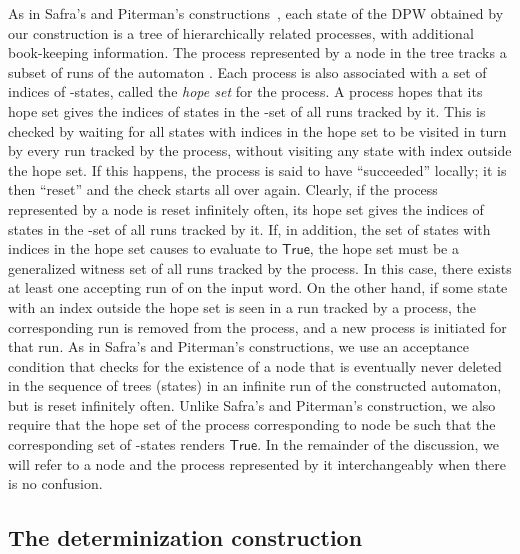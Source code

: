\documentclass[3p]{elsarticle}
\newcommand{\true}{\ensuremath{\mathsf{True}}}
\begin{document}
As in Safra's and Piterman's
constructions~\cite{safra-stoc92,safra06,2001automata,piterman}, each
state of the DPW obtained by our construction is a tree of
hierarchically related processes, with additional book-keeping
information. The process represented by a node in the tree tracks a
subset of runs of the automaton .  Each process is also
associated with a set of indices of -states, called the
\emph{hope set} for the process.  A process hopes that its hope set
gives the indices of states in the -set of all runs tracked by
it.  This is checked by waiting for all states with indices in the
hope set to be visited in turn by every run tracked by the process,
without visiting any state with index outside the hope set.  If this
happens, the process is said to have ``succeeded'' locally; it is then
``reset'' and the check starts all over again.  Clearly, if the
process represented by a node  is reset infinitely often, its hope
set gives the indices of states in the -set of all runs
tracked by it.  If, in addition, the set of states with indices in the
hope set causes  to evaluate to \true, the hope set must be a
generalized witness set of all runs tracked by the process.  In this
case, there exists at least one accepting run of  on the input
word.  On the other hand, if some state with an index outside the hope
set is seen in a run tracked by a process, the corresponding run is
removed from the process, and a new process is initiated for that run.
As in Safra's and Piterman's constructions, we use an acceptance
condition that checks for the existence of a node  that is
eventually never deleted in the sequence of trees (states) in an
infinite run of the constructed automaton, but is reset infinitely
often.  Unlike Safra's and Piterman's construction, we also require
that the hope set of the process corresponding to node  be such
that the corresponding set of -states renders  \true.  In
the remainder of the discussion, we will refer to a node and the
process represented by it interchangeably when there is no confusion.


\subsection{The determinization construction}
\label{sec:inf-set}
\end{document}
